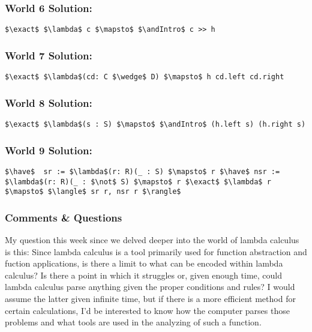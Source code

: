 \documentclass{article}
\DeclareMathOperator{\have}{have}
\DeclareMathOperator{\exact}{exact}
\DeclareMathOperator{\andIntro}{and\_intro}
\theoremstyle{theorem}
\theoremstyle{definition}
\theoremstyle{remark}
\begin{document}
    \subsubsection*{World 6 Solution:}
    \begin{lstlisting}[mathescape=true]
      $\exact$ $\lambda$ c $\mapsto$ $\andIntro$ c >> h
    \end{lstlisting}
    
    \subsubsection*{World 7 Solution:}
    \begin{lstlisting}[mathescape=true]
      $\exact$ $\lambda$(cd: C $\wedge$ D) $\mapsto$ h cd.left cd.right
    \end{lstlisting}

    \subsubsection*{World 8 Solution:}
    \begin{lstlisting}[mathescape=true]
      $\exact$ $\lambda$(s : S) $\mapsto$ $\andIntro$ (h.left s) (h.right s)
    \end{lstlisting}
    
    \subsubsection*{World 9 Solution:}
    \begin{lstlisting}[mathescape=true]
      $\have$  sr := $\lambda$(r: R)(_ : S) $\mapsto$ r $\have$ nsr := $\lambda$(r: R)(_ : $\not$ S) $\mapsto$ r $\exact$ $\lambda$ r $\mapsto$ $\langle$ sr r, nsr r $\rangle$
    \end{lstlisting}



  \subsubsection{Comments \& Questions}

  My question this week since we delved deeper into the world of lambda calculus is this: Since lambda calculus is a tool primarily used for function abstraction and fuction applications, is there a limit to what can be encoded within lambda calculus? Is there a point in which it struggles or, given enough time, could lambda calculus parse anything given the proper conditions and rules? I would assume the latter given infinite time, but if there is a more efficient method for certain calculations, I'd be interested to know how the computer parses those problems and what tools are used in the analyzing of such a function.
\end{document}
